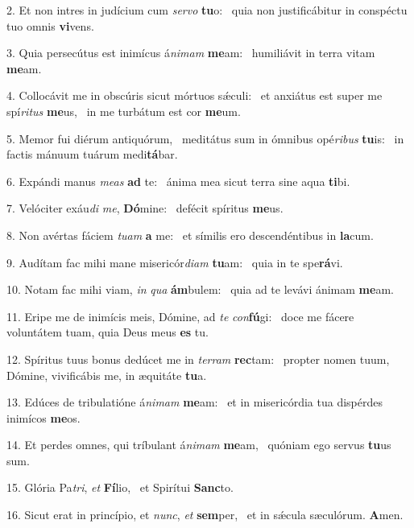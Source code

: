 2. Et non intres in judícium cum \textit{ser}\textit{vo} \textbf{tu}o: \ast\  quia non justificábitur in conspéctu tuo omnis \textbf{vi}vens.\

3. Quia persecútus est inimícus á\textit{ni}\textit{mam} \textbf{me}am: \ast\  humiliávit in terra vitam \textbf{me}am.\

4. Collocávit me in obscúris sicut mórtuos sǽculi: \dag\  et anxiátus est super me spí\textit{ri}\textit{tus} \textbf{me}us, \ast\  in me turbátum est cor \textbf{me}um.\

5. Memor fui diérum antiquórum, \dag\  meditátus sum in ómnibus opé\textit{ri}\textit{bus} \textbf{tu}is: \ast\  in factis mánuum tuárum medi\textbf{tá}bar.\

6. Expándi manus \textit{me}\textit{as} \textbf{ad} te: \ast\  ánima mea sicut terra sine aqua \textbf{ti}bi.\

7. Velóciter exáu\textit{di} \textit{me}, \textbf{Dó}mine: \ast\  defécit spíritus \textbf{me}us.\

8. Non avértas fáciem \textit{tu}\textit{am} \textbf{a} me: \ast\  et símilis ero descendéntibus in \textbf{la}cum.\

9. Audítam fac mihi mane misericór\textit{di}\textit{am} \textbf{tu}am: \ast\  quia in te spe\textbf{rá}vi.\

10. Notam fac mihi viam, \textit{in} \textit{qua} \textbf{ám}bulem: \ast\  quia ad te levávi ánimam \textbf{me}am.\

11. Eripe me de inimícis meis, Dómine, ad \textit{te} \textit{con}\textbf{fú}gi: \ast\  doce me fácere voluntátem tuam, quia Deus meus \textbf{es} tu.\

12. Spíritus tuus bonus dedúcet me in \textit{ter}\textit{ram} \textbf{rec}tam: \ast\  propter nomen tuum, Dómine, vivificábis me, in æquitáte \textbf{tu}a.\

13. Edúces de tribulatióne á\textit{ni}\textit{mam} \textbf{me}am: \ast\  et in misericórdia tua dispérdes inimícos \textbf{me}os.\

14. Et perdes omnes, qui tríbulant á\textit{ni}\textit{mam} \textbf{me}am, \ast\  quóniam ego servus \textbf{tu}us sum.\

15. Glória Pa\textit{tri}, \textit{et} \textbf{Fí}lio, \ast\  et Spirítui \textbf{Sanc}to.\

16. Sicut erat in princípio, et \textit{nunc}, \textit{et} \textbf{sem}per, \ast\  et in sǽcula sæculórum. \textbf{A}men.\

